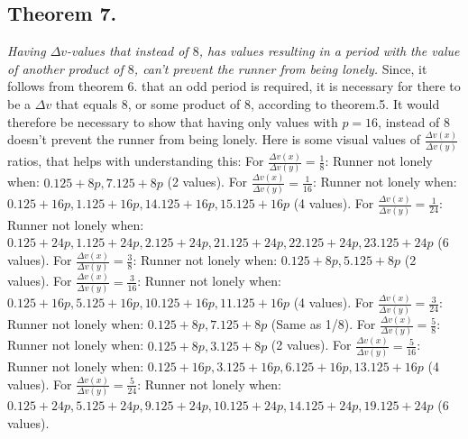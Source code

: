 \documentclass[12pt, a4paper]{article}
\begin{document}
\subsection*{Theorem 7.}\textit{Having $\Delta v$-values that instead of $8$, has values resulting in a period with the value of another product of $8$, can't prevent the runner from being lonely.}
\newline
\newline
Since, it follows from theorem 6. that an odd period is required, it is necessary for there to be a $\Delta v$ that equals $8$, or some product of $8$, according to theorem.5. It would therefore be necessary to show that having only values with $p=16$, instead of $8$ doesn't prevent the runner from being lonely.
\newline
\newline
Here is some visual values of $\frac{\Delta v(x)}{\Delta v(y)}$ ratios, that helps with understanding this: \newline
For $\frac{\Delta v(x)}{\Delta v(y)} =\frac{1}{8}$: Runner not lonely when: $0.125+8p, 7.125+8p$ (2 values). \newline For $\frac{\Delta v(x)}{\Delta v(y)} =\frac{1}{16}$: Runner not lonely when: $0.125+16p, 1.125+16p, 14.125+16p, 15.125+16p$ (4 values). \newline For $\frac{\Delta v(x)}{\Delta v(y)} =\frac{1}{24}$: Runner not lonely when: $0.125+24p, 1.125+24p, 2.125+24p, 21.125+24p, 22.125+24p, 23.125+24p$ (6 values).
\newline
\newline
For $\frac{\Delta v(x)}{\Delta v(y)} =\frac{3}{8}$: Runner not lonely when: $0.125+8p, 5.125+8p$ (2 values). \newline For $\frac{\Delta v(x)}{\Delta v(y)} =\frac{3}{16}$: Runner not lonely when: $0.125+16p, 5.125+16p, 10.125+16p, 11.125+16p$ (4 values). \newline For $\frac{\Delta v(x)}{\Delta v(y)} =\frac{3}{24}$: Runner not lonely when: $0.125+8p, 7.125+8p$ (Same as 1/8).
\newline
\newline
For $\frac{\Delta v(x)}{\Delta v(y)} =\frac{5}{8}$: Runner not lonely when: $0.125+8p, 3.125+8p$ (2 values). \newline For $\frac{\Delta v(x)}{\Delta v(y)} =\frac{5}{16}$: Runner not lonely when: $0.125+16p, 3.125+16p, 6.125+16p, 13.125+16p$ (4 values). \newline For $\frac{\Delta v(x)}{\Delta v(y)} =\frac{5}{24}$: Runner not lonely when: $0.125+24p, 5.125+24p, 9.125+24p, 10.125+24p, 14.125+24p, 19.125+24p$ (6 values).
\end{document}
